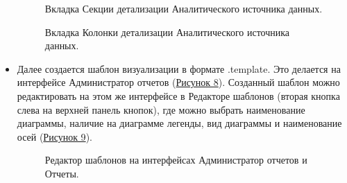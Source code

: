 \documentclass[a4paper]{extarticle}
\begin{document}
\begin{itemize}
\begin{figure}[H]
\caption{Вкладка Секции детализации Аналитического источника данных.}
\label{ris3_2}
\end{figure}\par
\begin{figure}[H]
\caption{Вкладка Колонки детализации Аналитического источника данных.}
\label{ris3_3}
\end{figure}\par
	\item Далее создается шаблон визуализации в формате .template. Это делается на интерфейсе Администратор отчетов (\hyperref[ris4_1]{Рисунок 8}). Созданный шаблон можно редактировать на этом же интерфейсе в Редакторе шаблонов (вторая кнопка слева на верхней панель кнопок), где можно выбрать наименование диаграммы, наличие на диаграмме легенды, вид диаграммы и наименование осей (\hyperref[ris5]{Рисунок 9}).
\begin{figure}[H]
\caption{Редактор шаблонов на интерфейсах Администратор отчетов и Отчеты.}
\label{ris5}
\end{figure}\par
\begin{figure}[H]

\end{figure}
\end{itemize}
\end{document}
